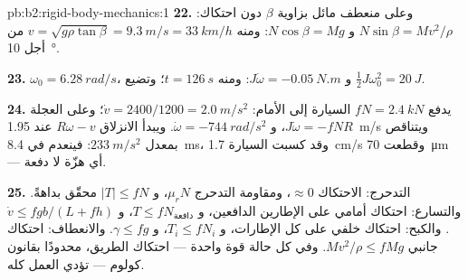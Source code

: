 \begin{solution}{pb:b2:rigid-body-mechanics:1}
\textbf{22.} وعلى منعطف مائل بزاوية $\beta$ دون احتكاك: $N\sin\beta =
Mv^2/\rho$ و $N\cos\beta = Mg$: ومنه $v = \sqrt{g\rho\tan\beta} = \qty{9.3}{m/s} =
\qty{33}{km/h}$ من أجل \qty{10}{\degree}.

\textbf{23.} $\omega_0 = \qty{6.28}{rad/s}$، و $J\dot\omega = \qty{-0.05}{N.m}$: ومنه $t =
\qty{126}{s}$؛ وتضيع $\tfrac12J\omega_0^2 = \qty{20}{J}$.

\textbf{24.} يدفع  $fN = \qty{2.4}{kN}$ السيارة إلى الأمام:
$\dot v = 2400/1200 = \qty{2.0}{m/s^2}$؛ وعلى العجلة $J\dot\omega = -fNR$،
و $\dot\omega = \qty{-744}{rad/s^2}$. ويبدأ الانزلاق $R\omega - v$ عند \qty{1.95}{m/s}
ويتناقص بمعدل $\qty{233}{m/s^2}$: فينعدم في \qty{8.4}{ms}، وقد كسبت السيارة
\qty{1.7}{cm/s} وقطعت \qty{70}{\micro m} --- أي هزّة لا دفعة.

\textbf{25.} التدحرج: الاحتكاك $\approx 0$، ومقاومة التدحرج $\mu_rN$،
و $|T| \le fN$ محقّق بداهةً. والتسارع: احتكاك أمامي على الإطارين
الدافعين، و $T \le fN_{\text{دافعة}}$، و $\dot v \le fgb/(L + fh)$. والكبح:
احتكاك خلفي على كل الإطارات، و $T_i \le fN_i$، و $\gamma \le fg$.
والانعطاف: احتكاك جانبي $Mv^2/\rho \le fMg$. وفي كل حالة قوة
واحدة --- احتكاك الطريق، محدودًا بقانون كولوم --- تؤدي العمل كله.
\end{solution}
